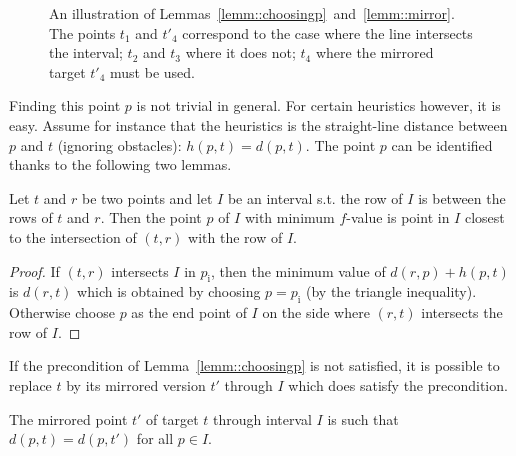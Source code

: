 \begin{figure}[tb]
  \begin{center}
    
  \end{center}
  \vspace{-1em}
  \caption{An illustration of Lemmas~\ref{lemm::choosingp}~and~\ref{lemm::mirror}.  The points $t_1$ and $t'_4$ correspond to the case 
where the line intersects the interval; 
$t_2$ and $t_3$ where it does not; 
$t_4$ where the mirrored target $t'_4$ must be used.
}
\label{fig::minf}
  \vspace{-0.5em}
\end{figure}

Finding this point $p$ %
is not trivial in general.  
For certain heuristics however, 
it is easy.  
Assume for instance 
that the heuristics is the straight-line distance 
between $p$ and $t$ (ignoring obstacles): $h(p,t) = d(p,t)$.  
The point $p$ can be identified 
thanks to the following two lemmas.  

\begin{lemm}\label{lemm::choosingp}
  Let $t$ and $r$ be two points 
  and let $I$ be an interval
  s.t. the row of $I$ is between the rows of $t$ and $r$.  
  Then the point $p$ of $I$ 
  with minimum $f$-value 
  is point in $I$ closest to the intersection of $(t,r)$ 
  with the row of $I$.  
\end{lemm}

\begin{proof}
  If $(t,r)$ intersects $I$ in $p_\mathrm{i}$, 
  then the minimum value of $d(r,p) + h(p,t)$ 
  is $d(r,t)$ which is obtained 
  by choosing $p = p_{\mathrm{i}}$ (by the triangle inequality).  
  Otherwise choose $p$ as the end point of $I$ 
  on the side where $(r,t)$ intersects the row of $I$.  
\end{proof}

If the precondition of Lemma~\ref{lemm::choosingp} is not satisfied, 
it is possible to replace $t$ by its mirrored version $t'$ through $I$ 
which does satisfy the precondition. 

\begin{lemm}
\label{lemm::mirror}
  The mirrored point $t'$ of target $t$ 
  through interval $I$ is such that   
  $d(p,t) = d(p,t')$ for all $p \in I$.  
\end{lemm}


